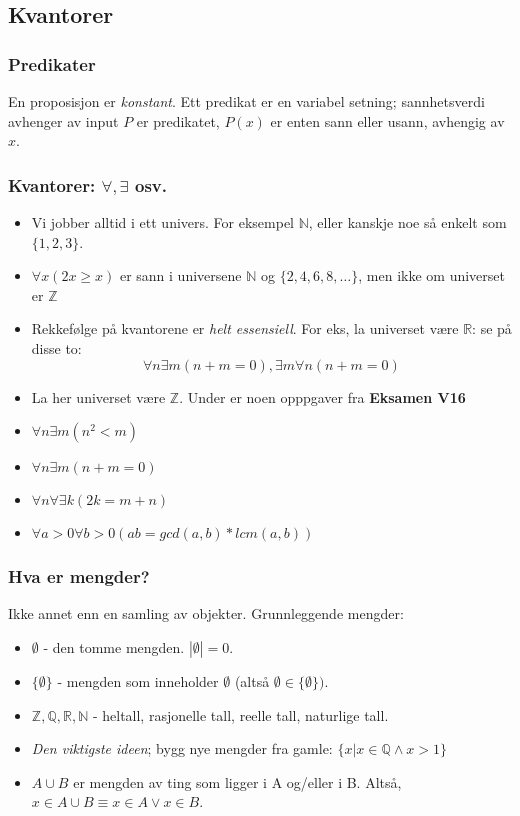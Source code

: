 \documentclass{beamer}
\begin{document}
\subsection{Kvantorer}

\begin{frame}
	\frametitle{Predikater}
	En proposisjon er \textit{konstant}. Ett predikat er en variabel setning; sannhetsverdi avhenger av input $P$ er predikatet, $P(x)$ er enten sann eller usann, avhengig av $x$. \newline
\end{frame}

\begin{frame}
\frametitle{Kvantorer: \ensuremath{\forall,\exists} osv.}
\begin{itemize}
	\item Vi jobber alltid i ett univers. For eksempel $\mathbb{N}$, eller kanskje noe så enkelt som $\{1,2,3\}$. 
	\item $\forall x(2x \geq x)$ er sann i universene $\mathbb{N}$ og $\{2,4,6,8,\dots\}$, men ikke om universet er $\mathbb{Z}$
	\item Rekkefølge på kvantorene er \textit{helt essensiell}. For eks, la universet være $\mathbb{R}$: se på disse to: \[\forall n \exists m (n + m = 0), \exists m \forall n (n + m = 0)\] 
	\item 
	La her universet være $\mathbb{Z}$. Under er noen opppgaver fra \textbf{Eksamen V16}
	\item $\forall n \exists m (n^2 < m)$
	\item $\forall n \exists m (n + m = 0)$
	\item $\forall n \forall \exists k (2k = m + n)$
	\item $\forall a > 0 \forall b > 0 (ab = gcd(a,b) * lcm(a,b))$
\end{itemize}
\end{frame}

\begin{frame}
\frametitle{Hva er mengder?}
Ikke annet enn en samling av objekter. Grunnleggende mengder:

\begin{itemize}
	\item $\emptyset$ - den tomme mengden. $|\emptyset| = 0$.
	\item $\{\emptyset\}$ - mengden som inneholder $\emptyset$ (altså $\emptyset \in \{\emptyset\})$.
	\item $\mathbb{Z},\mathbb{Q},\mathbb{R},\mathbb{N}$ - heltall, rasjonelle tall, reelle tall, naturlige tall.
	\item \textit{Den viktigste ideen}; bygg nye mengder fra gamle: $\{x | x \in \mathbb{Q} \wedge x > 1\}$
	\item $A \cup B$ er mengden av ting som ligger i A og/eller i B. Altså, $x \in A \cup B \equiv x \in A \vee x \in B$.
\end{itemize}
\end{frame}
\end{document}
